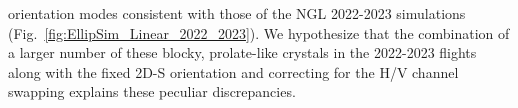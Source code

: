 \documentclass[amt, manuscript]{copernicus}
\begin{document}
orientation modes consistent with those of the NGL 2022-2023 simulations (Fig.~\ref{fig:EllipSim_Linear_2022_2023}). We hypothesize that the combination of a larger number of these blocky, prolate-like crystals in the 2022-2023 flights along with the fixed 2D-S orientation and correcting for the H/V channel swapping explains these peculiar discrepancies.  

\end{document}
